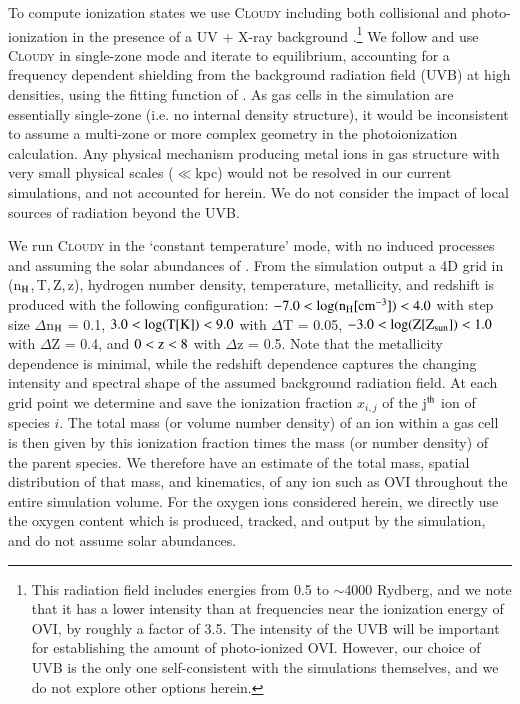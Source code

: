 \documentclass[useAMS,usenatbib]{mnras}
\newcommand{\ovi}{OVI\xspace}
\begin{document}
To compute ionization states we use \textsc{Cloudy} \citep[][v13.03]{ferland13} including both collisional and photo-ionization in the presence of a UV + X-ray background \citep[the 2011 update of][]{fg09}.\footnote{This radiation field includes energies from 0.5 to $\sim$4000 Rydberg, and we note that it has a lower intensity than \cite{hm12} at frequencies near the ionization energy of \ovi, by roughly a factor of 3.5. The intensity of the UVB will be important for establishing the amount of photo-ionized \ovi. However, our choice of UVB is the only one self-consistent with the simulations themselves, and we do not explore other options herein.} We follow \cite{bird14} and use \textsc{Cloudy} in single-zone mode and iterate to equilibrium, accounting for a frequency dependent shielding from the background radiation field (UVB) at high densities, using the fitting function of \cite{rahmati13}. As gas cells in the simulation are essentially single-zone (i.e. no internal density structure), it would be inconsistent to assume a multi-zone or more complex geometry in the photoionization calculation. Any physical mechanism producing metal ions in gas structure with very small physical scales ($\ll$kpc) would not be resolved in our current simulations, and not accounted for herein. We do not consider the impact of local sources of radiation beyond the UVB.

We run \textsc{Cloudy} in the `constant temperature' mode, with no induced processes \citep[following][]{wiersma09} and assuming the solar abundances of \cite{grevesse10}. From the simulation output a 4D grid in (n$_{\rm H}$,\,T,\,Z,\,z), hydrogen number density, temperature, metallicity, and redshift is produced with the following configuration: $-7.0 < \log(\rm{n}_{\rm H} [\rm{cm}^{-3}]) < 4.0$ with step size $\Delta$n$_{\rm H}$ = 0.1, $3.0 < \log(\rm{T} [\rm{K}]) < 9.0$ with $\Delta$T = 0.05, $-3.0 < \log(\rm{Z} [\rm{Z}_{\rm sun}]) < 1.0$ with $\Delta$Z = 0.4, and $0 < \rm{z} < 8$ with $\Delta$z = 0.5. Note that the metallicity dependence is minimal, while the redshift dependence captures the changing intensity and spectral shape of the assumed background radiation field. At each grid point we determine and save the ionization fraction $x_{i,j}$ of the j$^{\rm th}$ ion of species $i$. The total mass (or volume number density) of an ion within a gas cell is then given by this ionization fraction times the mass (or number density) of the parent species. We therefore have an estimate of the total mass, spatial distribution of that mass, and kinematics, of any ion such as \ovi throughout the entire simulation volume. For the oxygen ions considered herein, we directly use the oxygen content which is produced, tracked, and output by the simulation, and do not assume solar abundances.
\end{document}
